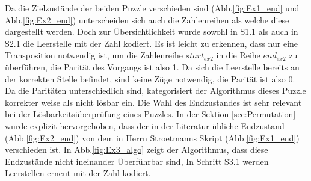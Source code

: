 Da die Zielzustände der beiden Puzzle verschieden sind (Abb.\ref{fig:Ex1_end} und Abb.\ref{fig:Ex2_end}) unterscheiden sich auch die Zahlenreihen als welche diese dargestellt werden. Doch zur Übersichtlichkeit wurde sowohl in S1.1 als auch in S2.1 die Leerstelle mit der Zahl  kodiert. Es ist leicht zu erkennen, dass nur eine Transposition notwendig ist, um die Zahlenreihe $start_{ex2}$ in die Reihe $end_{ex2}$ zu überführen, die Parität des Vorgangs ist also 1. Da sich die Leerstelle bereits an der korrekten Stelle befindet, sind keine Züge notwendig, die Parität ist also 0. Da die Paritäten unterschiedlich sind, kategorisiert der Algorithmus dieses Puzzle korrekter weise als  nicht lösbar ein.\WNL
%
%
Die Wahl des Endzustandes ist sehr relevant bei der Lösbarkeitsüberprüfung eines Puzzles. In der Sektion \ref{sec:Permutation} wurde explizit hervorgehoben, dass der in der Literatur übliche Endzustand (Abb.\ref{fig:Ex2_end}) von dem in Herrn Stroetmanns Skript \autocite{github-stroetmann:online} (Abb.\ref{fig:Ex1_end}) verschieden ist. In Abb.\ref{fig:Ex3_algo} zeigt der Algorithmus, dass diese Endzustände nicht ineinander Überführbar sind, In Schritt S3.1 werden Leerstellen erneut mit der Zahl  kodiert.
